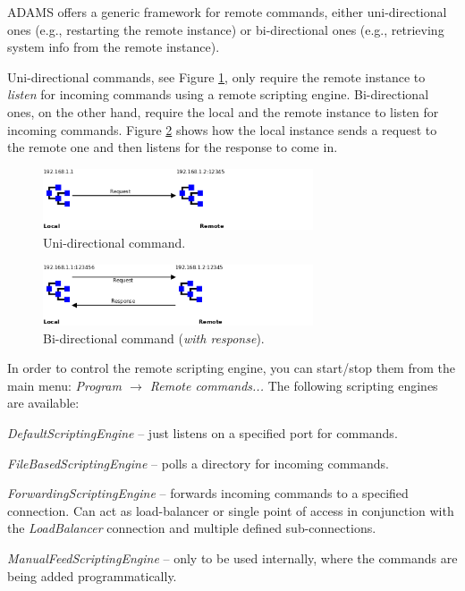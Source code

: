 ADAMS offers a generic framework for remote commands, either uni-directional
ones (e.g., restarting the remote instance) or bi-directional ones
(e.g., retrieving system info from the remote instance).

Uni-directional commands, see Figure \ref{remote_command-uni_directional},
only require the remote instance to \textit{listen} for incoming commands
using a remote scripting engine. Bi-directional ones, on the other hand,
require the local and the remote instance to listen for incoming commands.
Figure \ref{remote_command-bi_directional} shows how the local instance
sends a request to the remote one and then listens for the response to
come in.

\begin{figure}[htb]
  \centering
  \includegraphics[width=8.0cm]{images/remote_command-uni_directional.png}
  \caption{Uni-directional command.}
  \label{remote_command-uni_directional}
\end{figure}

\begin{figure}[htb]
  \centering
  \includegraphics[width=8.0cm]{images/remote_command-bi_directional.png}
  \caption{Bi-directional command (\textit{with response}).}
  \label{remote_command-bi_directional}
\end{figure}

In order to control the remote scripting engine, you can start/stop them
from the main menu: \textit{Program $\rightarrow$ Remote commands...}
The following scripting engines are available:
\begin{tight_itemize}
  \item \textit{DefaultScriptingEngine} -- just listens on a specified
  port for commands.
  \item \textit{FileBasedScriptingEngine} -- polls a directory for incoming
  commands.
  \item \textit{ForwardingScriptingEngine} -- forwards incoming commands
  to a specified connection. Can act as load-balancer or single point of access
  in conjunction with the \textit{LoadBalancer} connection and multiple defined
  sub-connections.
  \item \textit{ManualFeedScriptingEngine} -- only to be used internally, where
  the commands are being added programmatically.
\end{tight_itemize}

